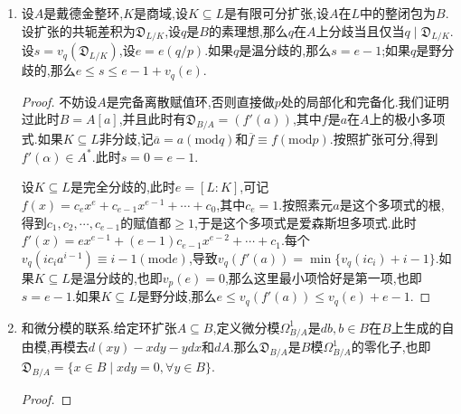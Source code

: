 \begin{enumerate}
\begin{proof}
    	最后$\delta_{L_q/K_p}(b)=\prod_{1\not=\tau\in\mathrm{Hom}_{K_p}(L_q,\overline{K}_p)}(b-\tau(b))$,并且$\delta_{B/A}(b)=\prod_{1\not=\sigma\in\mathrm{Hom}_K(L,\overline{K})}(b-\sigma(b))$.这里$K\to L\to\overline{K}$的嵌入可以提升为嵌入链$K_p\to L_q\to\overline{K}_p$,于是这里的$\sigma$都可以分解为$\tau_{ij}\circ\sigma_i$,其中$\sigma$是$L\to\overline{K}_p$提升得到的$L_{q_i}\to\overline{K}_p$,而$\tau_{ij}$是$p$扩张到$q$的分解群中的元.于是$\delta_{B/A}(b)$可表示为$\prod_{\tau\not=1}(b-\tau b)\prod_{2\le i\le r}\prod_j(b-\tau_{ij}\sigma_i(b))$.于是只需验证后面这个乘积式子为1.我们有$|b-\tau_{ij}\sigma_i(b)|=|\tau_{ij}^{-1}(b)-\sigma_i(b)|=|\tau_{ij}^{-1}b-\alpha+\alpha-\sigma_i(b)|$.其中$\tau_{ij}^{-1}(b)-\alpha$赋值是1,而$\alpha-\sigma_i(b)$赋值充分小,于是整个的赋值为1.
    \end{proof}
    \item 设$A$是戴德金整环,$K$是商域,设$K\subseteq L$是有限可分扩张,设$A$在$L$中的整闭包为$B$.设扩张的共轭差积为$\mathfrak{D}_{L/K}$,设$q$是$B$的素理想,那么$q$在$A$上分歧当且仅当$q\mid\mathfrak{D}_{L/K}$.设$s=v_q(\mathfrak{D}_{L/K})$,设$e=e(q/p)$.如果$q$是温分歧的,那么$s=e-1$;如果$q$是野分歧的,那么$e\le s\le e-1+v_q(e)$.
    \begin{proof}
    	
    	不妨设$A$是完备离散赋值环,否则直接做$p$处的局部化和完备化.我们证明过此时$B=A[a]$,并且此时有$\mathfrak{D}_{B/A}=(f'(a))$,其中$f$是$a$在$A$上的极小多项式.如果$K\subseteq L$非分歧,记$\overline{a}=a(\mathrm{mod}q)$和$\overline{f}\equiv f(\mathrm{mod}p)$.按照扩张可分,得到$f'(\alpha)\in A^*$.此时$s=0=e-1$.
    	
    	设$K\subseteq L$是完全分歧的,此时$e=[L:K]$,可记$f(x)=c_ex^e+c_{e-1}x^{e-1}+\cdots+c_0$,其中$c_e=1$.按照素元$a$是这个多项式的根,得到$c_1,c_2,\cdots,c_{e-1}$的赋值都$\ge1$,于是这个多项式是爱森斯坦多项式.此时$f'(x)=ex^{e-1}+(e-1)c_{e-1}x^{e-2}+\cdots+c_1$.每个$v_q(ic_ia^{i-1})\equiv i-1(\mathrm{mod}e)$,导致$v_q(f'(a))=\min\{v_q(ic_i)+i-1\}$.如果$K\subseteq L$是温分歧的,也即$v_p(e)=0$,那么这里最小项恰好是第一项,也即$s=e-1$.如果$K\subseteq L$是野分歧,那么$e\le v_q(f'(a))\le v_q(e)+e-1$.
    \end{proof}
    \item 和微分模的联系.给定环扩张$A\subseteq B$,定义微分模$\Omega^1_{B/A}$是$db,b\in B$在$B$上生成的自由模,再模去$d(xy)-xdy-ydx$和$dA$.那么$\mathfrak{D}_{B/A}$是$B$模$\Omega_{B/A}^1$的零化子,也即$\mathfrak{D}_{B/A}=\{x\in B\mid xdy=0,\forall y\in B\}$.
    \begin{proof}
    	

\end{proof}
\end{enumerate}
